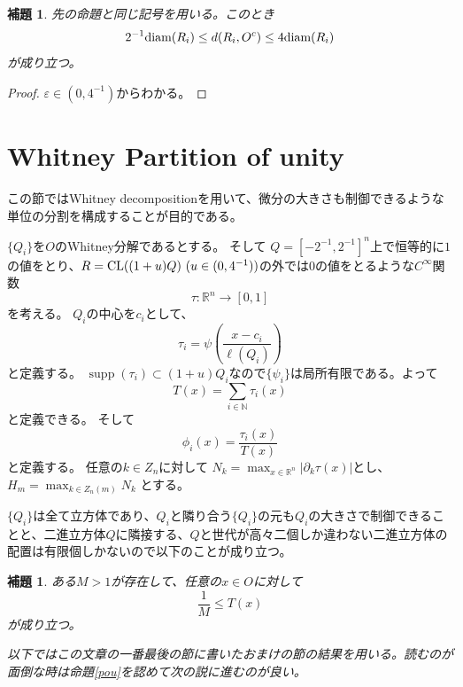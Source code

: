 \documentclass[leqno]{jsarticle}
\newtheorem{lem}[thm]{補題}
\newcommand{\nn}{\mathbb{N}}
\newcommand{\rr}{\mathbb{R}}
\newcommand{\ep}{\varepsilon}
\DeclareMathOperator{\supp}{supp}
\newcommand{\cl}{\text{{\rm CL}}}
\newcommand{\di}{\text{{\rm diam}}}
\begin{document}
\begin{lem}\label{H}
先の命題と同じ記号を用いる。このとき
\[
2^{-1}\di(R_i)\le d(R_i,O^c)\le 4\di(R_i)
\]
が成り立つ。
\end{lem}
\begin{proof}
$\ep\in (0,4^{-1})$からわかる。
\end{proof}

\section{Whitney Partition of unity}
この節ではWhitney decompositionを用いて、微分の大きさも制御できるような単位の分割を構成することが目的である。

$\{Q_i\}$を$O$のWhitney分解であるとする。
そして
$Q=[-2^{-1}, 2^{-1}]^n$上で恒等的に$1$の値をとり、$R=\cl((1+u)Q)\ (u\in (0,4^{-1}))$の外では$0$の値をとるような$C^{\infty}$関数
\[
\tau:\rr^n\to [0,1]
\]を考える。
$Q_i$の中心を$c_i$として、
\[
\tau_i=\psi\left(\frac{x-c_i}{\ell(Q_i)}\right)
\]
と定義する。
$\supp(\tau_i)\subset (1+u)Q_i$なので$\{\psi_i\}$は局所有限である。よって
\[
T(x)=\sum_{i\in \nn}\tau_i(x)
\]
と定義できる。
そして
\[
\phi_i(x)=\frac{\tau_i(x)}{T(x)}
\]
と定義する。
任意の$k\in Z_n$に対して
$N_k=\max_{x\in \rr^n}|\partial_k\tau(x)|$とし、
$H_m=\max_{k\in Z_n(m)}N_k$
とする。

$\{Q_i\}$は全て立方体であり、$Q_i$と隣り合う$\{Q_i\}$の元も$Q_i$の大きさで制御できることと、二進立方体$Q$に隣接する、$Q$と世代が高々二個しか違わない二進立方体の配置は有限個しかないので以下のことが成り立つ。
\begin{lem}
ある$M>1$が存在して、任意の$x\in O$に対して
\[
\frac{1}{M}\le T(x)
\]
が成り立つ。
\end{lem}

\emph{以下ではこの文章の一番最後の節に書いたおまけの節の結果を用いる。読むのが面倒な時は命題\ref{pou}を認めて次の説に進むのが良い。}
\end{document}
